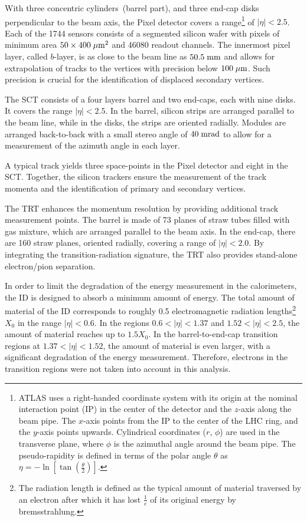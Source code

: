 With three concentric cylinders~(barrel part), and three end-cap disks
perpendicular to the beam axis, the Pixel detector covers a
range\footnote{ATLAS uses a right-handed coordinate system
  with its origin at the nominal interaction point (IP) in the center
  of the detector and the $z$-axis along the beam pipe. 
  The $x$-axis points from the IP to the center of the LHC ring, and the $y$-axis points
  upwards. Cylindrical coordinates ($r$, $\phi$) are used in the
  transverse plane, where $\phi$ is the azimuthal angle around the beam pipe. The
  pseudo-rapidity is defined in terms of the polar angle $\theta$ as 
  \mbox{$\eta = - \ln \left[ \tan \left( \frac{\theta}{2} \right)
    \right]$}.} of \mbox{$|\eta| < 2.5$}.
Each of the 1744 sensors consists of a segmented silicon wafer with
pixels of minimum area \mbox{$50 \times 400 \; \mu\mathrm{m}^2$} and 46080 readout channels.
The innermost pixel layer, called $b$-layer, is as close to the beam
line as \mbox{$50.5 \; \mathrm{mm}$} and allows for extrapolation of tracks
to the vertices with precision below \mbox{$100 \; \mu\mathrm{m}$}.
Such precision is crucial for the identification of displaced secondary vertices.

The SCT consists of a four layers barrel and two end-caps, each with nine disks.
It covers the range \mbox{$|\eta| < 2.5$}.
In the barrel, silicon strips are arranged parallel to the beam line, 
while in the disks, the strips are oriented radially.
Modules are arranged back-to-back with a small stereo angle of \mbox{$40 \; \mathrm{mrad}$} 
to allow for a measurement of the azimuth angle in each layer.

A typical track yields three space-points in the Pixel detector and eight in the SCT.
Together, the silicon trackers ensure the measurement of the track momenta 
and the identification of primary and secondary vertices.

The TRT enhances the momentum resolution by providing additional
track measurement points.
The barrel is made of 73 planes of straw tubes
filled with gas mixture, which are arranged parallel to the beam axis.
In the end-cap, there are 160 straw planes, oriented radially,
covering a range of \mbox{$|\eta| < 2.0$}. 
By integrating the transition-radiation signature, the TRT also provides
stand-alone electron/pion separation.

In order to limit the degradation of the energy measurement in the calorimeters, 
the ID is designed to absorb a minimum amount of energy.
The total amount of material of the ID corresponds to roughly 0.5 electromagnetic radiation
lengths\footnote{The radiation length is defined as the typical amount of material traversed 
by an electron after which it has lost
$\frac{1}{e}$ of its original energy by bremsstrahlung.}
$X_0$ in the range \mbox{$|\eta| < 0.6$}.
In the regions \mbox{$0.6 < |\eta| < 1.37$} and \mbox{$1.52 < |\eta| < 2.5$}, 
the amount of material reaches up to \mbox{$1.5 X_0$}.
In the barrel-to-end-cap transition regions at \mbox{$1.37 < |\eta| < 1.52$}, 
the amount of material is even larger, with a significant degradation of the energy measurement. 
Therefore, electrons in the transition regions were not taken into account in this analysis.

